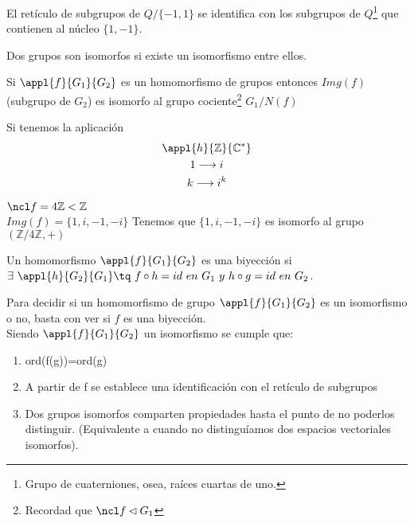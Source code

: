 \documentclass[nochap]{apuntes}
\begin{document}
\begin{example}
El retículo de subgrupos de $Q/{\{ -1, 1 \} }$ se identifica con los subgrupos de $Q$\footnote{Grupo de cuaterniones, osea, raíces cuartas de uno.} que contienen al núcleo $\{ 1, -1\} $.
\end{example}

\begin{defn}
Dos grupos son isomorfos si existe un isomorfismo entre ellos.
\end{defn}

\begin{theorem}\label{thmIsomorfia1}
Si $\appl{f}{G_1}{G_2}$ es un homomorfismo de grupos entonces $Img(f)$ (subgrupo de $G_2$) es isomorfo al grupo cociente\footnote{Recordad que $\ncl f \lhd G_1$} $G_1/{N(f)}$
\end{theorem}

\begin{example}
Si tenemos la aplicación 
\begin{gather*}
\appl{h}{\mathbb{Z}}{\mathbb{C}^*}\\
1 \longrightarrow i\\
k\longrightarrow i^{k}\\
\end{gather*}

$\ncl f = 4\mathbb{Z} < \mathbb{Z}$\\
$Img(f) = \{1, i, -1, -i \}$
Tenemos que $\{ 1, i, -1, -i \}$ es isomorfo al grupo $(\mathbb{Z} /4\mathbb{Z}, +)$
\end{example}

\begin{defn}[Biyección]
 Un homomorfismo $\appl{f}{G_1}{G_2}$ es una biyección si \\
 $\exists \ \appl{h}{G_2}{G_1} \tq \ f\circ h =id \ en \ G_1 \ y\ h \circ g = id \ en \ G_2$.
\end{defn}
Para decidir si un homomorfismo de grupo $\appl{f}{G_1}{G_2}$  es un isomorfismo o no, basta con ver si $f$  es una biyección.\\

Siendo $\appl{f}{G_1}{G_2}$ un isomorfismo se cumple que:
\begin{enumerate}
 \item ord(f(g))=ord(g)
 \item A partir de f se establece una identificación con el retículo de subgrupos
 \item Dos grupos isomorfos comparten propiedades hasta el punto de no poderlos distinguir. (Equivalente a cuando no distinguíamos
 dos espacios vectoriales isomorfos).
\end{enumerate}
\end{document}
